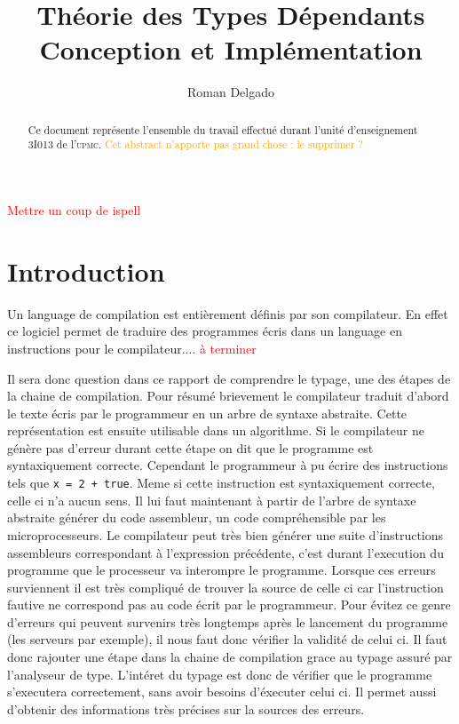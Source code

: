 \documentclass {article}
\title{Théorie des Types Dépendants\\Conception et Implémentation}
\author{Roman Delgado}
\date{}
\theoremstyle{definition}
\theoremstyle{remark}
\newcommand{\todo}[1]{\textcolor{red}{#1}}
\newcommand{\attention}[1]{\textcolor{orange}{#1}}
\begin{document}
\maketitle



\todo{Mettre un coup de ispell}

\begin{abstract} 
  Ce document représente l'ensemble du travail effectué durant l'unité d'enseignement 3I013 de l'\textsc{upmc}. \attention{Cet abstract n'apporte pas grand chose : le supprimer ?}
\end{abstract}

\setcounter{tocdepth}{2}
\tableofcontents

\clearpage


\section{Introduction}


Un language de compilation est entièrement définis par son compilateur. En effet ce logiciel permet de traduire
des programmes écris dans un language en instructions pour le compilateur.... \todo{à terminer}

Il sera donc question dans ce rapport de comprendre le typage, une des étapes de la chaine de compilation.
Pour résumé brievement le compilateur 
traduit d'abord le texte écris par le programmeur en un arbre de syntaxe abstraite. Cette représentation est ensuite utilisable
dans un algorithme.
Si le compilateur ne génère pas d'erreur durant cette étape on dit que le programme est syntaxiquement correcte. Cependant 
le programmeur à pu écrire des instructions tels que \lstinline!x = 2 + true!. Meme si cette instruction est syntaxiquement correcte, celle ci 
n'a aucun sens. Il lui faut maintenant à partir de l'arbre de syntaxe abstraite générer du code assembleur, un code compréhensible 
par les microprocesseurs. Le compilateur peut très bien générer une suite d'instructions assembleurs correspondant à l'expression 
précédente, c'est durant l'execution du programme que le processeur va interompre le programme. Lorsque ces erreurs surviennent il est 
très compliqué de trouver la source de celle ci car l'instruction fautive ne correspond pas au code écrit par le programmeur. 
Pour évitez ce genre d'erreurs qui peuvent survenirs très longtemps après le lancement du programme (les serveurs par exemple), 
il nous faut donc vérifier la validité de celui ci. Il faut donc rajouter une étape dans la chaine de compilation grace au typage 
assuré par l'analyseur de type.
L'intéret du typage est donc de vérifier que le programme s'executera correctement, sans avoir besoins d'éxecuter celui ci. 
Il permet aussi d'obtenir des informations très précises sur la sources des erreurs.
\end{document}

